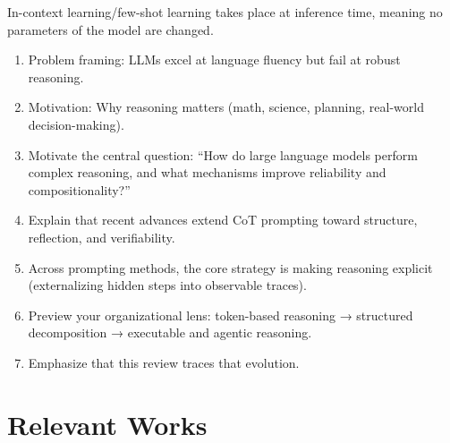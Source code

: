 \documentclass[project]{bsu-cs}  %
\begin{document}
In-context learning/few-shot learning takes place at inference time, meaning no parameters of the model are changed.
% 
\begin{enumerate}
    \item Problem framing: LLMs excel at language fluency but fail at robust reasoning.
    
    \item Motivation: Why reasoning matters (math, science, planning, real-world decision-making).
    
    \item Motivate the central question: “How do large language models perform complex reasoning, and what mechanisms improve reliability and compositionality?”

    \item Explain that recent advances extend CoT prompting toward structure, reflection, and verifiability.

    \item Across prompting methods, the core strategy is making reasoning explicit (externalizing hidden steps into observable traces).

    \item Preview your organizational lens: token-based reasoning → structured decomposition → executable and agentic reasoning.

    \item Emphasize that this review traces that evolution.
\end{enumerate}
% 
\chapter{Relevant Works}\label{ch:works}
% 
% 
%
%
% 
\end{document}

